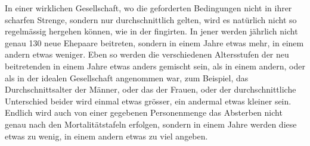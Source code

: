 \documentclass[12pt,a4paper]{article}
\begin{document}
In einer wirklichen Gesellschaft, wo die geforderten Bedingungen nicht in ihrer scharfen Strenge, sondern nur durchschnittlich gelten, wird es nat\"urlich nicht so regelm\"assig hergehen k\"onnen, wie in der fingirten. In jener werden j\"ahrlich nicht genau 130 neue Ehepaare beitreten, sondern in einem Jahre etwas mehr, in einem andern etwas weniger. Eben so werden die verschiedenen Altersstufen der neu beitretenden in einem Jahre etwas anders gemischt sein, als in einem andern, oder als in der idealen Gesellschaft angenommen war, zum Beispiel, das Durchschnittsalter der M\"anner, oder das der Frauen, oder der durchschnittliche Unterschied beider wird einmal etwas gr\"osser, ein andermal etwas kleiner sein. Endlich wird auch von einer gegebenen Personenmenge das Absterben nicht genau nach den Mortalit\"atstafeln erfolgen, sondern in einem Jahre werden diese etwas zu wenig, in einem andern etwas zu viel angeben.
\end{document}
